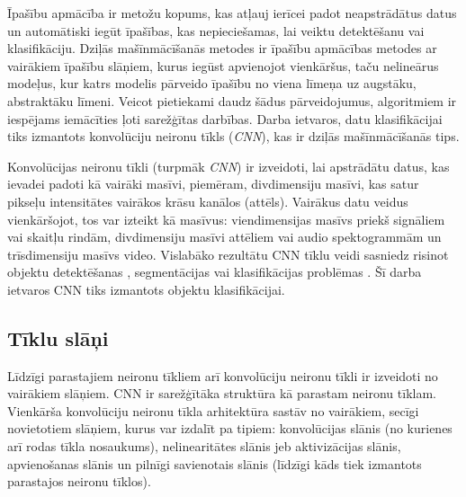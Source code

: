 Īpašību apmācība ir metožu kopums, kas atļauj ierīcei padot neapstrādātus datus un automātiski iegūt īpašības, kas nepieciešamas, lai veiktu detektēšanu vai klasifikāciju. Dziļās mašīnmācīšanās metodes ir īpašību apmācības metodes ar vairākiem īpašību slāņiem, kurus iegūst apvienojot vienkāršus, taču nelineārus modeļus, kur katrs modelis pārveido īpašību no viena līmeņa uz augstāku, abstraktāku līmeni. Veicot pietiekami daudz šādus pārveidojumus, algoritmiem ir iespējams iemācīties ļoti sarežģītas darbības.\cite{deepnet} Darba ietvaros, datu klasifikācijai tiks izmantots konvolūciju neironu tīkls (\textit{CNN}), kas ir dziļās mašīnmācīšanās tips.

Konvolūcijas neironu tīkli (turpmāk \textit{CNN}) ir izveidoti, lai apstrādātu datus, kas ievadei padoti kā vairāki masīvi, piemēram, divdimensiju masīvi, kas satur pikseļu intensitātes vairākos krāsu kanālos (attēls). Vairākus datu veidus vienkāršojot, tos var izteikt kā masīvus: viendimensijas masīvs priekš signāliem vai skaitļu rindām, divdimensiju masīvi attēliem vai audio spektogrammām un trīsdimensiju masīvs video. Vislabāko rezultātu CNN tīklu veidi sasniedz risinot objektu detektēšanas \cite{li2015convolutional}\cite{matsugu2003subject}, segmentācijas \cite{long2015fully} vai klasifikācijas problēmas \cite{classif}\cite{krizhevsky2012imagenet}\cite{jia2014caffe}. Šī darba ietvaros CNN tiks izmantots objektu klasifikācijai.

\subsection{Tīklu slāņi}
Līdzīgi parastajiem neironu tīkliem arī konvolūciju neironu tīkli ir izveidoti no vairākiem slāņiem. CNN ir sarežģītāka struktūra kā parastam neironu tīklam. Vienkārša konvolūciju neironu tīkla arhitektūra sastāv no vairākiem, secīgi novietotiem slāņiem, kurus var izdalīt pa tipiem: konvolūcijas slānis (no kurienes arī rodas tīkla nosaukums), nelinearitātes slānis jeb aktivizācijas slānis, apvienošanas slānis un pilnīgi savienotais slānis (līdzīgi kāds tiek izmantots parastajos neironu tīklos). 

